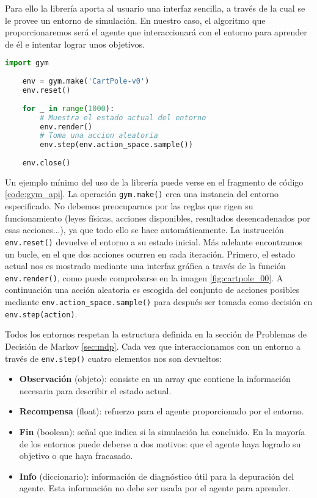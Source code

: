 Para ello la librería aporta al usuario una interfaz sencilla, a través de la cual se le provee un entorno de simulación. En nuestro caso, el algoritmo que proporcionaremos será el agente que interaccionará con el entorno para aprender de él e intentar lograr unos objetivos.

\begin{minipage}{0.9\linewidth}%
    \begin{lstlisting}[frame=tb, language=Python, caption=Creación y renderizado del entorno CartPole, label=code:gym_api]
    import gym
    
    env = gym.make('CartPole-v0')
    env.reset()
    
    for _ in range(1000):
        # Muestra el estado actual del entorno
        env.render()
        # Toma una accion aleatoria
        env.step(env.action_space.sample())
    
    env.close()
    \end{lstlisting}%
\end{minipage}

Un ejemplo mínimo del uso de la librería puede verse en el fragmento de código \ref{code:gym_api}. La operación \texttt{gym.make()} crea una instancia del entorno especificado. No debemos preocuparnos por las reglas que rigen su funcionamiento (leyes físicas, acciones disponibles, resultados desencadenados por esas acciones...), ya que todo ello se hace automáticamente. La instrucción \texttt{env.reset()} devuelve el entorno a su estado inicial. Más adelante encontramos un bucle, en el que dos acciones ocurren en cada iteración. Primero, el estado actual nos es mostrado mediante una interfaz gráfica a través de la función \texttt{env.render()}, como puede comprobarse en la imagen \ref{fig:cartpole_00}. A continuación una acción aleatoria es escogida del conjunto de acciones posibles mediante \texttt{env.action\_space.sample()} para después ser tomada como decisión en \texttt{env.step(action)}.

Todos los entornos respetan la estructura definida en la sección de Problemas de Decisión de Markov \ref{sec:mdp}. Cada vez que interaccionamos con un entorno a través de \texttt{env.step()} cuatro elementos nos son devueltos:
\begin{itemize}
    \item \textbf{Observación} (objeto): consiste en un array que contiene la información necesaria para describir el estado actual.
    \item \textbf{Recompensa} (float): refuerzo para el agente proporcionado por el entorno.
    \item \textbf{Fin} (boolean): señal que indica si la simulación ha concluido. En la mayoría de los entornos puede deberse a dos motivos: que el agente haya logrado su objetivo o que haya fracasado.
    \item \textbf{Info} (diccionario): información de diagnóstico útil para la depuración del agente. Esta información no debe ser usada por el agente para aprender.
\end{itemize}

